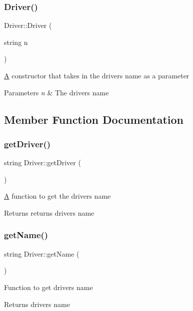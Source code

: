 \subsubsection{\texorpdfstring{Driver()}{Driver()}}
{\footnotesize\ttfamily Driver\+::\+Driver (\begin{DoxyParamCaption}\item[{string}]{n }\end{DoxyParamCaption})}

\hyperlink{classA}{A} constructor that takes in the drivers name as a parameter 
\begin{DoxyParams}{Parameters}
{\em n} & The drivers name \\
\hline
\end{DoxyParams}


\subsection{Member Function Documentation}
\mbox{\label{classDriver_abd055f2390a62d8347115e6616ce5aa3}} 
\subsubsection{\texorpdfstring{get\+Driver()}{getDriver()}}
{\footnotesize\ttfamily string Driver\+::get\+Driver (\begin{DoxyParamCaption}{ }\end{DoxyParamCaption})}

\hyperlink{classA}{A} function to get the drivers name \begin{DoxyReturn}{Returns}
returns drivers name 
\end{DoxyReturn}
\mbox{\label{classDriver_ae85810c10f8aa5f9db23633b5c86edcf}} 
\subsubsection{\texorpdfstring{get\+Name()}{getName()}}
{\footnotesize\ttfamily string Driver\+::get\+Name (\begin{DoxyParamCaption}{ }\end{DoxyParamCaption})}

Function to get drivers name \begin{DoxyReturn}{Returns}
drivers name 
\end{DoxyReturn}
\mbox{\label{classDriver_a96ea452112b25946d7a68005e75bd125}} 

